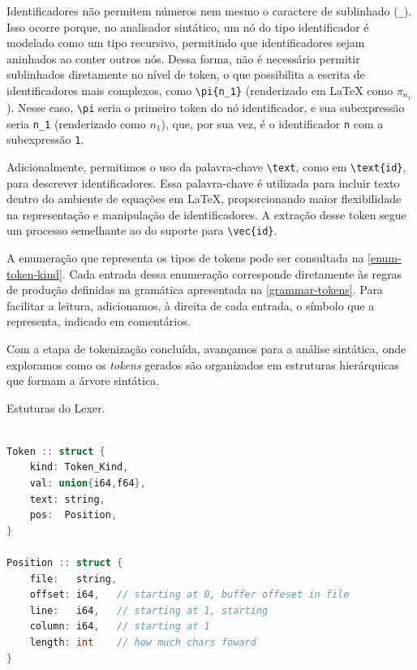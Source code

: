 \label{lexer-subexpression}
Identificadores não permitem números nem mesmo o caractere de sublinhado (\verb|_|). Isso ocorre porque, no analisador sintático, um nó do tipo identificador é modelado como um tipo recursivo, permitindo que identificadores sejam aninhados ao conter outros nós. Dessa forma, não é necessário permitir sublinhados diretamente no nível de token, o que possibilita a escrita de identificadores mais complexos, como \verb|\pi{n_1}| (renderizado em \LaTeX{} como $\pi_{n_1}$). Nesse caso, \verb|\pi| seria o primeiro token do nó identificador, e sua subexpressão seria \verb|n_1| (renderizado como $n_1$), que, por sua vez, é o identificador \verb|n| com a subexpressão \verb|1|.

Adicionalmente, permitimos o uso da palavra-chave \verb|\text|, como em \verb|\text{id}|, para descrever identificadores. Essa palavra-chave é utilizada para incluir texto dentro do ambiente de equações em \LaTeX{}, proporcionando maior flexibilidade na representação e manipulação de identificadores. A extração desse token segue um processo semelhante ao do suporte para \verb|\vec{id}|.

A enumeração que representa os tipos de tokens pode ser consultada na \autoref{enum-token-kind}. Cada entrada dessa enumeração corresponde diretamente às regras de produção definidas na gramática apresentada na \autoref{grammar-tokens}. Para facilitar a leitura, adicionamos, à direita de cada entrada, o símbolo que a representa, indicado em comentários.

Com a etapa de tokenização concluída, avançamos para a análise sintática, onde exploramos como os \textit{tokens} gerados são organizados em estruturas hierárquicas que formam a árvore sintática.

\begin{codigo}[htb]
        \caption{\small Estuturas do Lexer. }
        \label{lexer-structs}
\begin{lstlisting}[language=C++]

Token :: struct {
    kind: Token_Kind,
    val: union{i64,f64},
    text: string,
    pos:  Position,
}

Position :: struct {
    file:   string,
    offset: i64,   // starting at 0, buffer offeset in file
    line:   i64,   // starting at 1, starting
    column: i64,   // starting at 1
    length: int    // how much chars foward
}
    
  \end{lstlisting}
\end{codigo}


